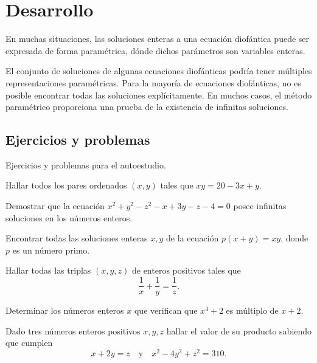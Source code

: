 \section{Desarrollo}

En muchas situaciones, las soluciones enteras a una ecuación diofántica puede ser expresada de forma paramétrica, dónde dichos parámetros son variables enteras.

El conjunto de soluciones de algunas ecuaciones diofánticas podría tener múltiples representaciones paramétricas.
Para la mayoría de ecuaciones diofánticas, no es posible encontrar todas las soluciones explícitamente.
En muchos casos, el método paramétrico proporciona una prueba de la existencia de infinitas soluciones.


\subsection{Ejercicios y problemas}

Ejercicios y problemas para el autoestudio.

\begin{exercise}
    Hallar todos los pares ordenados $(x,y)$ tales que $xy = 20 - 3x + y$.
\end{exercise}

\begin{exercise}
    Demostrar que la ecuación $x^2 + y^2 - z^2 - x + 3y - z - 4 = 0$ posee infinitas soluciones en los números enteros.
\end{exercise}

\begin{exercise}
    Encontrar todas las soluciones enteras $x,y$ de la ecuación $p(x + y) = xy$, donde $p$ es un número primo.
\end{exercise}

\begin{exercise}
    Hallar todas las triplas $(x,y,z)$ de enteros positivos tales que
    \[
        \frac{1}{x} + \frac{1}{y} = \frac{1}{z}.
    \]
\end{exercise}

\begin{exercise}
    Determinar los números enteros $x$ que verifican que $x^4 + 2$ es múltiplo de $x + 2$.
\end{exercise}

\begin{exercise}
    Dado tres números enteros positivos $x,y,z$ hallar el valor de su producto sabiendo que cumplen
    \[
        x + 2y = z \quad \text{y} \quad x^2 - 4y^2 + z^2 = 310.
    \]
\end{exercise}

